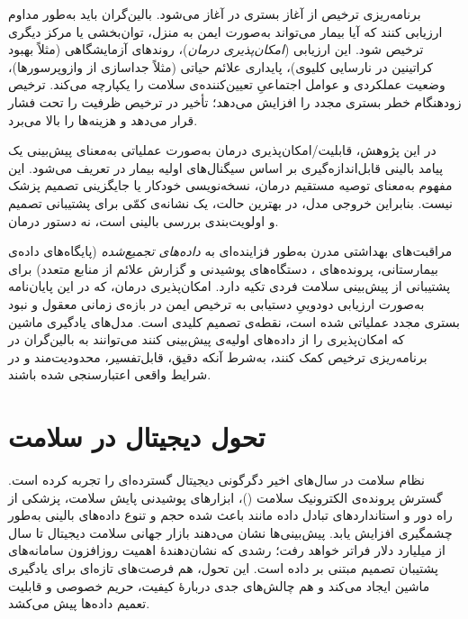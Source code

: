 برنامه‌ریزی ترخیص از آغاز بستری در  آغاز می‌شود. بالین‌گران باید به‌طور مداوم ارزیابی کنند که آیا بیمار می‌تواند به‌صورت ایمن به منزل، توان‌بخشی یا مرکز دیگری ترخیص شود. این ارزیابی (\emph{امکان‌پذیری درمان})، روندهای آزمایشگاهی (مثلاً بهبود کراتینین در نارسایی کلیوی)، پایداری علائم حیاتی (مثلاً جداسازی از وازوپرسورها)، وضعیت عملکردی و عوامل اجتماعیِ تعیین‌کننده‌ی سلامت را یکپارچه می‌کند. ترخیص زودهنگام خطر بستری مجدد را افزایش می‌دهد؛ تأخیر در ترخیص ظرفیت  را تحت فشار قرار می‌دهد و هزینه‌ها را بالا می‌برد.

در این پژوهش، قابلیت/امکان‌پذیری درمان به‌صورت عملیاتی به‌معنای پیش‌بینی یک پیامد بالینی قابل‌اندازه‌گیری بر اساس سیگنال‌های اولیه بیمار در  تعریف می‌شود. این مفهوم به‌معنای توصیه مستقیم درمان، نسخه‌نویسی خودکار یا جایگزینی تصمیم پزشک نیست. بنابراین خروجی مدل، در بهترین حالت، یک نشانه‌ی کمّی برای پشتیبانی تصمیم و اولویت‌بندی بررسی بالینی است، نه دستور درمان.

مراقبت‌های بهداشتی مدرن به‌طور فزاینده‌ای به \emph{داده‌های تجمیع‌شده} (پایگاه‌های داده‌ی بیمارستانی، پرونده‌های ، دستگاه‌های پوشیدنی و گزارش علائم از منابع متعدد) برای پشتیبانی از پیش‌بینی سلامت فردی تکیه دارد. امکان‌پذیری درمان، که در این پایان‌نامه به‌صورت ارزیابی دودوییِ دستیابی به ترخیص ایمن در بازه‌ی زمانی معقول و نبود بستری مجدد عملیاتی شده است، نقطه‌ی تصمیم کلیدی است. مدل‌های یادگیری ماشین که امکان‌پذیری را از داده‌های اولیه‌ی  پیش‌بینی کنند می‌توانند به بالین‌گران در برنامه‌ریزی ترخیص کمک کنند، به‌شرط آنکه دقیق، قابل‌تفسیر، محدودیت‌مند و در شرایط واقعی اعتبارسنجی شده باشند.

\section{تحول دیجیتال در سلامت}

نظام سلامت در سال‌های اخیر دگرگونی دیجیتال گسترده‌ای را تجربه کرده است. گسترش پرونده‌ی الکترونیک سلامت ()، ابزارهای پوشیدنی پایش سلامت، پزشکی از راه دور و استانداردهای تبادل داده مانند  باعث شده حجم و تنوع داده‌های بالینی به‌طور چشمگیری افزایش یابد. پیش‌بینی‌ها نشان می‌دهند بازار جهانی سلامت دیجیتال تا سال  از  میلیارد دلار فراتر خواهد رفت؛ رشدی که نشان‌دهندۀ اهمیت روزافزون سامانه‌های پشتیبان تصمیم مبتنی بر داده است. این تحول، هم فرصت‌های تازه‌ای برای یادگیری ماشین ایجاد می‌کند و هم چالش‌های جدی دربارۀ کیفیت، حریم خصوصی و قابلیت تعمیم داده‌ها پیش می‌کشد.

